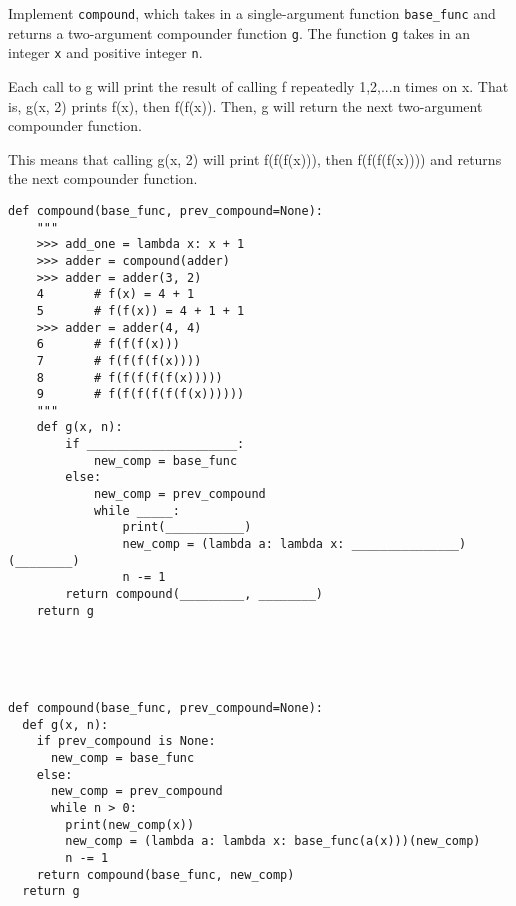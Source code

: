 \begin{blocksection}
\question Implement \lstinline$compound$, which takes in a single-argument function \lstinline$base_func$ and returns a two-argument compounder function \lstinline$g$. The function \lstinline$g$ takes in an integer \lstinline$x$ and positive integer \lstinline$n$.

Each call to g will print the result of calling f repeatedly 1,2,...n times on x. That is, g(x, 2) prints f(x), then f(f(x)). Then, g will return the next two-argument compounder function.

This means that calling g(x, 2) will print f(f(f(x))), then f(f(f(f(x)))) and returns the next compounder function.

\begin{lstlisting}
def compound(base_func, prev_compound=None):
	"""
	>>> add_one = lambda x: x + 1
	>>> adder = compound(adder)
	>>> adder = adder(3, 2)
	4       # f(x) = 4 + 1
	5       # f(f(x)) = 4 + 1 + 1
	>>> adder = adder(4, 4)
	6       # f(f(f(x)))
	7       # f(f(f(f(x))))
	8       # f(f(f(f(f(x)))))
	9       # f(f(f(f(f(f(x))))))
	"""
	def g(x, n):
	    if _____________________:
			new_comp = base_func
		else:
			new_comp = prev_compound
			while _____:
	       		print(___________)
	        	new_comp = (lambda a: lambda x: _______________)(________)
	        	n -= 1
		return compound(_________, ________)
	return g





\end{lstlisting}

\begin{solution}[1in]
\begin{lstlisting}
def compound(base_func, prev_compound=None):
  def g(x, n):
    if prev_compound is None:
      new_comp = base_func
    else:
      new_comp = prev_compound
      while n > 0:
        print(new_comp(x))
        new_comp = (lambda a: lambda x: base_func(a(x)))(new_comp)
        n -= 1
    return compound(base_func, new_comp)
  return g

\end{lstlisting}
\end{solution}
\end{blocksection}